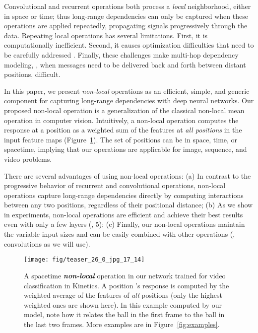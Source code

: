 \documentclass[10pt,twocolumn,letterpaper]{article}
\newcommand{\bd}[1]{\textbf{#1}}
\begin{document}
Convolutional and recurrent operations both process a \emph{local} neighborhood, either in space or time; thus long-range dependencies can only be captured when these operations are applied repeatedly, propagating signals progressively through the data. Repeating local operations has several limitations. First, it is computationally inefficient. Second, it causes optimization difficulties that need to be carefully addressed \cite{Hochreiter1997,He2016}. Finally, these challenges make multi-hop dependency modeling, \eg, when messages need to be delivered back and forth between distant positions, difficult.

In this paper, we present \emph{non-local} operations as an efficient, simple, and generic component for capturing long-range dependencies with deep neural networks. Our proposed non-local operation is a generalization of the classical non-local mean operation \cite{Buades2005} in computer vision. Intuitively, a non-local operation computes the response at a position as a weighted sum of the features at \emph{all positions} in the input feature maps (Figure~\ref{fig:teaser}). The set of positions can be in space, time, or spacetime, implying that our operations are applicable for image, sequence, and video problems.

There are several advantages of using non-local operations: (a) In contrast to the progressive behavior of recurrent and convolutional operations, non-local operations capture long-range dependencies directly by computing interactions between any two positions, regardless of their positional distance; (b) As we show in experiments, non-local operations are efficient and achieve their best results even with only a few layers (\eg, 5); (c) Finally, our non-local operations maintain the variable input sizes and can be easily combined with other operations (\eg, convolutions as we will use).

\begin{figure}[t]
\centering
\texttt{[image: fig/teaser\_26\_0\_jpg\_17\_14]}
\vspace{-1em}
\caption{A spacetime \emph{\bd{non-local}} operation in our network trained for video classification in Kinetics. A position 's response is computed by the weighted average of the features of \emph{all} positions  (only the highest weighted ones are shown here). In this example computed by our model, note how it relates the ball in the first frame to the ball in the last two frames. More examples are in Figure~\ref{fig:examples}.}
\label{fig:teaser}
\vspace{-1.1em}
\end{figure}
\end{document}
